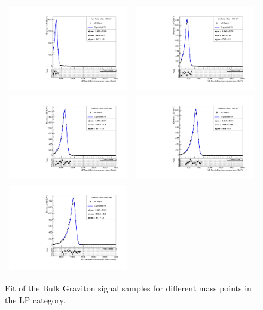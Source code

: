 \begin{figure}[!ht]
\caption{ Fit of the Bulk Graviton signal samples for different mass points in the LP category.}
\begin{tabular}{cc}
  \includegraphics[width=170pt]{figuresARC/fits/BulkGravLP800.pdf} &
  \includegraphics[width=170pt]{figuresARC/fits/BulkGravLP1000.pdf}\\
  \includegraphics[width=170pt]{figuresARC/fits/BulkGravLP1200.pdf}&
\includegraphics[width=170pt]{figuresARC/fits/BulkGravLP1400.pdf} \\
  \includegraphics[width=170pt]{figuresARC/fits/BulkGravLP1600.pdf} &

\end{tabular}
\end{figure}
